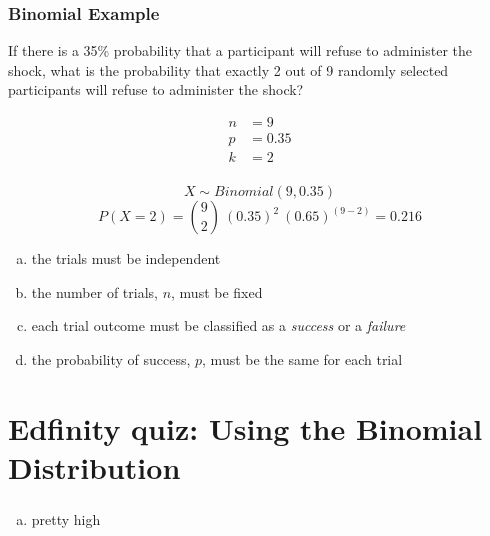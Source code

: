 \documentclass[11pt,containsverbatim,handout]{beamer}
\begin{document}

\begin{frame}
\frametitle{Binomial Example}
If there is a 35\% probability that a participant will refuse to administer the shock, what is the probability that exactly 2 out of 9 randomly selected participants will refuse to administer the shock?

\pause

\begin{align*}
n&=9  \\
p&=0.35 \\
k&=2 \\
\end{align*}

\pause

\[X\sim Binomial(9, 0.35)\]
\[P(X=2) = {9 \choose 2}~(0.35)^2~(0.65)^{(9-2)} = 0.216\]

\end{frame}

\begin{frame}


\begin{enumerate}[(a)]
\item the trials must be independent
\item the number of trials, $n$, must be fixed
\item each trial outcome must be classified as a \textit{success} or a \textit{failure}
\item the probability of success, $p$, must be the same for each trial
\end{enumerate}

\end{frame}




\section{Edfinity quiz: Using the Binomial Distribution}


\begin{frame}
\frametitle{}


\begin{enumerate}[(a)]
\item pretty high
\end{enumerate}

\vfill


\end{frame}
\end{document}
